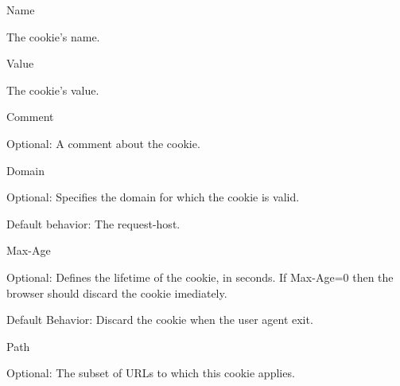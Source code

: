 \begin{DoxyItemize}
\item Name\par
 The cookie's name.\par

\item Value\par
 The cookie's value.\par

\item Comment\par

\begin{DoxyItemize}
\item Optional: A comment about the cookie.\par

\end{DoxyItemize}
\item Domain\par

\begin{DoxyItemize}
\item Optional: Specifies the domain for which the cookie is valid.\par

\item Default behavior: The request-\/host.\par

\end{DoxyItemize}
\item Max-\/Age\par

\begin{DoxyItemize}
\item Optional: Defines the lifetime of the cookie, in seconds. If Max-\/Age=0 then the browser should discard the cookie imediately.\par

\item Default Behavior: Discard the cookie when the user agent exit.\par

\end{DoxyItemize}
\item Path\par

\begin{DoxyItemize}
\item Optional: The subset of URLs to which this cookie applies.\par


\end{DoxyItemize}
\end{DoxyItemize}
